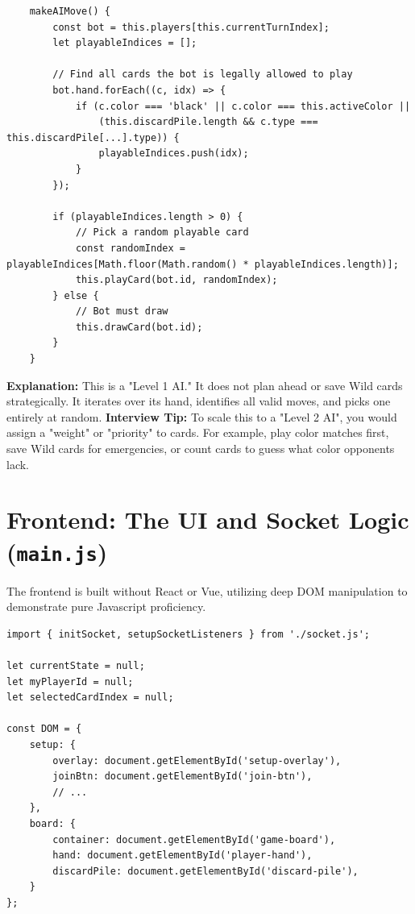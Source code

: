 \documentclass[11pt,a4paper]{article}
\begin{document}
\begin{verbatim}
    makeAIMove() {
        const bot = this.players[this.currentTurnIndex];
        let playableIndices = [];
        
        // Find all cards the bot is legally allowed to play
        bot.hand.forEach((c, idx) => {
            if (c.color === 'black' || c.color === this.activeColor || 
                (this.discardPile.length && c.type === this.discardPile[...].type)) {
                playableIndices.push(idx);
            }
        });

        if (playableIndices.length > 0) {
            // Pick a random playable card
            const randomIndex = playableIndices[Math.floor(Math.random() * playableIndices.length)];
            this.playCard(bot.id, randomIndex);
        } else {
            // Bot must draw
            this.drawCard(bot.id);
        }
    }
\end{verbatim}

\textbf{Explanation:} 
This is a "Level 1 AI." It does not plan ahead or save Wild cards strategically. It iterates over its hand, identifies all valid moves, and picks one entirely at random. 
\textbf{Interview Tip:} To scale this to a "Level 2 AI", you would assign a "weight" or "priority" to cards. For example, play color matches first, save Wild cards for emergencies, or count cards to guess what color opponents lack.

\section{Frontend: The UI and Socket Logic (\texttt{main.js})}
The frontend is built without React or Vue, utilizing deep DOM manipulation to demonstrate pure Javascript proficiency.

\begin{verbatim}
import { initSocket, setupSocketListeners } from './socket.js';

let currentState = null;
let myPlayerId = null;
let selectedCardIndex = null;

const DOM = {
    setup: {
        overlay: document.getElementById('setup-overlay'),
        joinBtn: document.getElementById('join-btn'),
        // ...
    },
    board: {
        container: document.getElementById('game-board'),
        hand: document.getElementById('player-hand'),
        discardPile: document.getElementById('discard-pile'),
    }
};
\end{verbatim}
\end{document}
